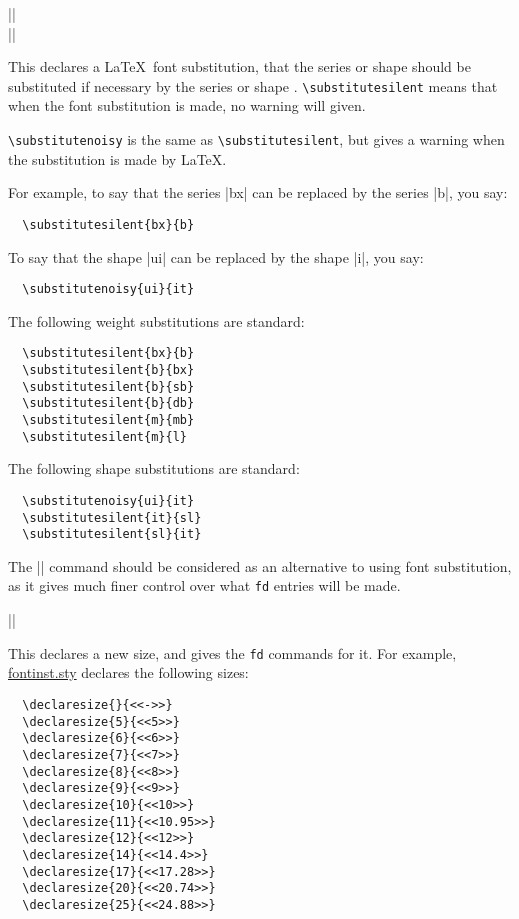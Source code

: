\documentclass[a4paper]{ltxguide}
\newcommand*{\setfilename}[1]{\texttt{#1}}
\newcommand{\fd} {\setfilename{fd}\xspace}
\begin{document}
\begin{decl}
  |\substitutesilent|\\
  |\substitutenoisy|
\end{decl}
This declares a \LaTeX\ font substitution, that the series or shape
 should be substituted if necessary by the series or shape
.  \verb|\substitutesilent| means that when the font
substitution is made, no warning will given.

\verb|\substitutenoisy| is the same as \verb|\substitutesilent|, but
gives a warning when the substitution is made by \LaTeX.

For example, to say that the series |bx| can be replaced by the
series |b|, you say:
\begin{verbatim}
  \substitutesilent{bx}{b}
\end{verbatim}
To say that the shape |ui| can be replaced by the shape |i|, you say:
\begin{verbatim}
  \substitutenoisy{ui}{it}
\end{verbatim}

The following weight substitutions are standard:
\begin{verbatim}
  \substitutesilent{bx}{b}
  \substitutesilent{b}{bx}
  \substitutesilent{b}{sb}
  \substitutesilent{b}{db}
  \substitutesilent{m}{mb}
  \substitutesilent{m}{l}
\end{verbatim}
The following shape substitutions are standard:
\begin{verbatim}
  \substitutenoisy{ui}{it}
  \substitutesilent{it}{sl}
  \substitutesilent{sl}{it}
\end{verbatim}

The |\installfontas| command should be considered as an 
alternative to using font substitution, as it gives much finer 
control over what \fd entries will be made.


\begin{decl}
  |\declaresize|
\end{decl}
This declares a new size, and gives the \fd commands for it.  For
example, \url{fontinst.sty} declares the following sizes:
\begin{verbatim}
  \declaresize{}{<<->>}
  \declaresize{5}{<<5>>}
  \declaresize{6}{<<6>>}
  \declaresize{7}{<<7>>}
  \declaresize{8}{<<8>>}
  \declaresize{9}{<<9>>}
  \declaresize{10}{<<10>>}
  \declaresize{11}{<<10.95>>}
  \declaresize{12}{<<12>>}
  \declaresize{14}{<<14.4>>}
  \declaresize{17}{<<17.28>>}
  \declaresize{20}{<<20.74>>}
  \declaresize{25}{<<24.88>>}
\end{verbatim}
\end{document}

